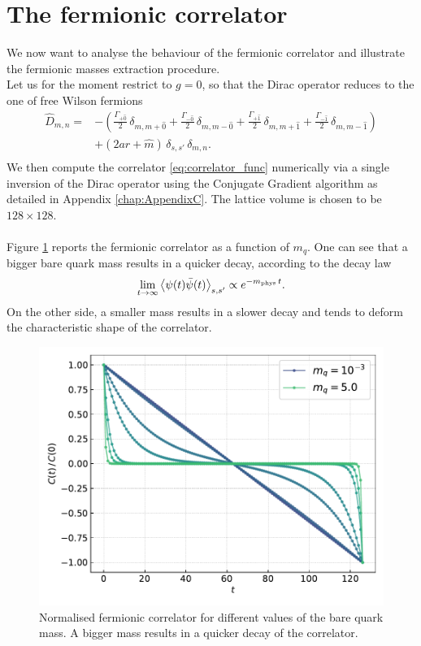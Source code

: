 \section{The fermionic correlator}
We now want to analyse the behaviour of the fermionic correlator and illustrate the fermionic masses extraction procedure. \\
Let us for the moment restrict to $g = 0$, so that the Dirac operator reduces to the one of free Wilson fermions 
\begin{equation}
    \begin{aligned}
    \widehat{D}_{m, n} = &- \left(\frac{\Gamma_{+\hat 0}}{2} \, \delta_{m, m+\hat 0} +\frac{\Gamma_{-\hat 0}}{2} \, \delta_{m, m-\hat 0} + \frac{\Gamma_{+\hat 1}}{2} \, \delta_{m, m+\hat 1} + \frac{\Gamma_{- \hat 1}}{2} \, \delta_{m, m-\hat 1}\right)  \\
     &+ \left(2ar + \hat m \right) \, \delta_{s,s'} \, \delta_{m,n}. \\
    \end{aligned}
    \label{eq:wilson-dirac_operator_free}
\end{equation}
We then compute the correlator \eqref{eq:correlator_func} numerically via a single inversion of the Dirac operator using the Conjugate Gradient algorithm as detailed in Appendix \ref{chap:AppendixC}. The lattice volume is chosen to be $128 \times 128$. \\~\\
Figure \ref{fig:correlator_mass} reports the fermionic correlator as a function of $m_q$. One can see that a bigger bare quark mass results in a quicker decay, according to the decay law 
\begin{equation*}
    \lim_{t \to \infty} \left\langle \psi(t)\bar\psi(t) \right\rangle_{s,s'} \propto e^{-m_\text{phys} \, t}.
\end{equation*}
On the other side, a smaller mass results in a slower decay and tends to deform the characteristic shape of the correlator.
\begin{figure}[h]
    \centering 
    \includegraphics[scale=0.6]{figures/correlator/correlator.pdf}
    \caption[Fermionic correlator]{Normalised fermionic correlator for different values of the bare quark mass. A bigger mass results in a quicker decay of the correlator.}
    \label{fig:correlator_mass}
\end{figure}\\
